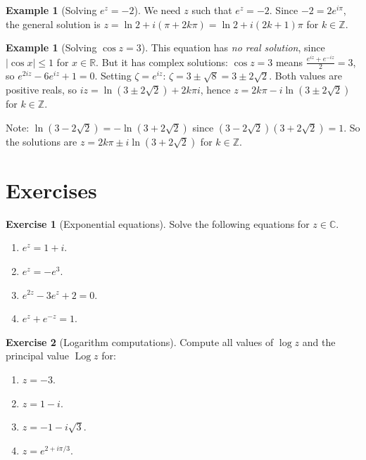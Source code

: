 \documentclass[12pt,a4paper,openany]{book}
\theoremstyle{definition}
\newtheorem{example}[definition]{Example}
\newtheorem{exercise}{Exercise}[chapter]
\theoremstyle{plain}
\theoremstyle{remark}
\newcommand{\C}{\mathbb{C}}
\newcommand{\R}{\mathbb{R}}
\newcommand{\Z}{\mathbb{Z}}
\DeclareMathOperator{\Log}{Log}
\newcommand{\abs}[1]{\left|#1\right|}
\begin{document}
\begin{example}[Solving $e^z = -2$]\label{ex:solve-exp}
We need $z$ such that $e^z = -2$.  Since $-2 = 2e^{i\pi}$, the general
solution is $z = \ln 2 + i(\pi + 2k\pi) = \ln 2 + i(2k+1)\pi$ for $k\in\Z$.
\end{example}

\begin{example}[Solving $\cos z = 3$]\label{ex:solve-cos}
This equation has \emph{no real solution}, since $\abs{\cos x}\le 1$ for
$x\in\R$.  But it has complex solutions:
$\cos z = 3$ means $\frac{e^{iz}+e^{-iz}}{2}=3$, so $e^{2iz}-6e^{iz}+1=0$.
Setting $\zeta = e^{iz}$: $\zeta = 3\pm\sqrt{8} = 3\pm 2\sqrt{2}$.
Both values are positive reals, so $iz = \ln(3\pm 2\sqrt{2})+2k\pi i$,
hence $z = 2k\pi - i\ln(3\pm 2\sqrt{2})$ for $k\in\Z$.

Note: $\ln(3-2\sqrt{2}) = -\ln(3+2\sqrt{2})$ since
$(3-2\sqrt{2})(3+2\sqrt{2})=1$.  So the solutions are
$z = 2k\pi \pm i\ln(3+2\sqrt{2})$ for $k\in\Z$.
\end{example}

\section{Exercises}
\label{sec:ch3-exercises}

\begin{exercise}[Exponential equations]\label{exo:exp-equations}
Solve the following equations for $z\in\C$.
\begin{enumerate}[label=\textup{(\alph*)}]
  \item $e^z = 1+i$.
  \item $e^z = -e^3$.
  \item $e^{2z} - 3e^z + 2 = 0$.
  \item $e^z + e^{-z} = 1$.
\end{enumerate}
\end{exercise}

\begin{exercise}[Logarithm computations]\label{exo:log-compute}
Compute all values of $\log z$ and the principal value $\Log z$ for:
\begin{enumerate}[label=\textup{(\alph*)}]
  \item $z = -3$.
  \item $z = 1-i$.
  \item $z = -1-i\sqrt{3}$.
  \item $z = e^{2+i\pi/3}$.
\end{enumerate}
\end{exercise}
\end{document}

